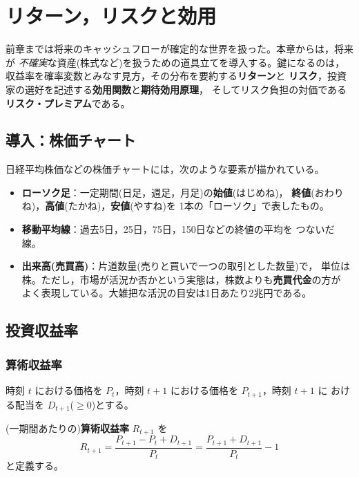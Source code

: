 \chapter{リターン，リスクと効用}

前章までは将来のキャッシュフローが確定的な世界を扱った。本章からは，将来が
\emph{不確実}な資産(株式など)を扱うための道具立てを導入する。鍵になるのは，
収益率を確率変数とみなす見方，その分布を要約する\textbf{リターン}と
\textbf{リスク}，投資家の選好を記述する\textbf{効用関数}と\textbf{期待効用原理}，
そしてリスク負担の対価である\textbf{リスク・プレミアム}である。

\section*{導入：株価チャート}

日経平均株価などの株価チャートには，次のような要素が描かれている。

\begin{itemize}
\item \textbf{ローソク足}：一定期間(日足，週足，月足)の\textbf{始値}(はじめね)，
\textbf{終値}(おわりね)，\textbf{高値}(たかね)，\textbf{安値}(やすね)を
1本の「ローソク」で表したもの。
\item \textbf{移動平均線}：過去5日，25日，75日，150日などの終値の平均を
つないだ線。
\item \textbf{出来高(売買高)}：片道数量(売りと買いで一つの取引とした数量)で，
単位は株。ただし，市場が活況か否かという実態は，株数よりも\textbf{売買代金}の方が
よく表現している。大雑把な活況の目安は1日あたり2兆円である。
\end{itemize}

\section{投資収益率}

\subsection{算術収益率}

時刻 $t$ における価格を $P_t$，時刻 $t+1$ における価格を $P_{t+1}$，時刻 $t+1$ に
おける配当を $D_{t+1}$($\geq 0$)とする。

\begin{definition}[算術収益率]
(一期間あたりの)\textbf{算術収益率} $R_{t+1}$ を
\begin{equation}
R_{t+1} = \frac{P_{t+1} - P_t + D_{t+1}}{P_t}
= \frac{P_{t+1} + D_{t+1}}{P_t} - 1
\label{eq:arith-return}
\end{equation}
と定義する。
\end{definition}

